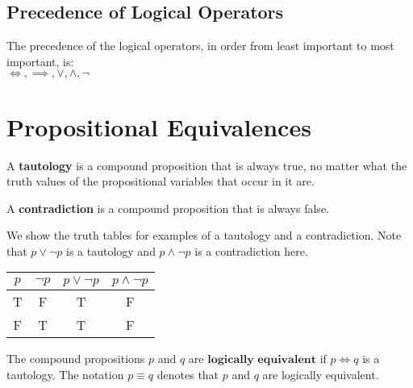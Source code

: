 \documentclass{article}
\newtheorem{definition}{Definition}[subsection]
\newtheorem{remark}{Remark}[subsection]
\newtheorem{example}{Example}[subsection]
\begin{document}
\subsection{Precedence of Logical Operators}
\begin{tcolorbox}
[colback=cyan!5!white,colframe=cyan!75!black,title=\begin{remark}
\end{remark}]
The precedence of the logical operators, in order from least important to most important, is:\\
$\iff,\implies,\lor,\wedge,\neg$
\end{tcolorbox}
\section{Propositional Equivalences}
\begin{tcolorbox}
[colback=blue!5!white,colframe=blue!75!black,title=\begin{definition}
\end{definition}]
A \textbf{tautology} is a compound proposition that is always true, no matter what the truth values of the propositional variables that occur in it are.
\end{tcolorbox}
\begin{tcolorbox}
[colback=blue!5!white,colframe=blue!75!black,title=\begin{definition}
\end{definition}] 
A \textbf{contradiction} is a compound proposition that is always false.
\end{tcolorbox}
\begin{tcolorbox}
[colback=red!5!white,colframe=red!75!black,title=\begin{example}
\end{example}]
We show the truth tables for examples of a tautology and a contradiction. Note that $p \lor \neg p$ is a tautology and $p \wedge \neg p$ is a contradiction here.
\end{tcolorbox}
\begin{table}[h]
       \centering
       \begin{tabular}{|c|c|c|c|}
       \hline
       $p$&$\neg p$&$p\lor \neg p$&$p\wedge \neg p$\\ \hline
       T&F&T&F\\ \hline
       F&T&T&F\\ \hline
       \end{tabular}
\end{table}  
\begin{tcolorbox}
[colback=blue!5!white,colframe=blue!75!black,title=\begin{definition}
\end{definition}]
The compound propositions $p$ and $q$ are $\textbf{logically equivalent}$ if $p\iff q$ is a tautology. The notation $p\equiv q$ denotes that $p$ and $q$ are logically equivalent.
\end{tcolorbox}
\end{document}
